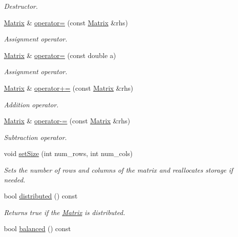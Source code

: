 \begin{DoxyCompactItemize}
\begin{DoxyCompactList}\small\item\em Destructor. \end{DoxyCompactList}\item 
\hyperlink{class_c_a_r_o_m_1_1_matrix}{Matrix} \& \hyperlink{class_c_a_r_o_m_1_1_matrix_a6d8bd9665218767afe7f87abe483996f}{operator=} (const \hyperlink{class_c_a_r_o_m_1_1_matrix}{Matrix} \&rhs)
\begin{DoxyCompactList}\small\item\em Assignment operator. \end{DoxyCompactList}\item 
\hyperlink{class_c_a_r_o_m_1_1_matrix}{Matrix} \& \hyperlink{class_c_a_r_o_m_1_1_matrix_a8e16f2bab44e0c094db4547b6f93d723}{operator=} (const double a)
\begin{DoxyCompactList}\small\item\em Assignment operator. \end{DoxyCompactList}\item 
\hyperlink{class_c_a_r_o_m_1_1_matrix}{Matrix} \& \hyperlink{class_c_a_r_o_m_1_1_matrix_a9eeeaf162c0cbd6a23dd4f00b56b8425}{operator+=} (const \hyperlink{class_c_a_r_o_m_1_1_matrix}{Matrix} \&rhs)
\begin{DoxyCompactList}\small\item\em Addition operator. \end{DoxyCompactList}\item 
\hyperlink{class_c_a_r_o_m_1_1_matrix}{Matrix} \& \hyperlink{class_c_a_r_o_m_1_1_matrix_a916566ad6fcc2ba6eae2a3675e813625}{operator-\/=} (const \hyperlink{class_c_a_r_o_m_1_1_matrix}{Matrix} \&rhs)
\begin{DoxyCompactList}\small\item\em Subtraction operator. \end{DoxyCompactList}\item 
void \hyperlink{class_c_a_r_o_m_1_1_matrix_a0a0305bbb1a56b44c6e2df61152d0a5e}{set\-Size} (int num\-\_\-rows, int num\-\_\-cols)
\begin{DoxyCompactList}\small\item\em Sets the number of rows and columns of the matrix and reallocates storage if needed. \end{DoxyCompactList}\item 
bool \hyperlink{class_c_a_r_o_m_1_1_matrix_a861d3e43b223e8f3217f64a536281605}{distributed} () const 
\begin{DoxyCompactList}\small\item\em Returns true if the \hyperlink{class_c_a_r_o_m_1_1_matrix}{Matrix} is distributed. \end{DoxyCompactList}\item 
\hypertarget{class_c_a_r_o_m_1_1_matrix_aeb1c2a74e21480520dd71cafc7435965}{bool \hyperlink{class_c_a_r_o_m_1_1_matrix_aeb1c2a74e21480520dd71cafc7435965}{balanced} () const }\label{class_c_a_r_o_m_1_1_matrix_aeb1c2a74e21480520dd71cafc7435965}


\end{DoxyCompactItemize}
